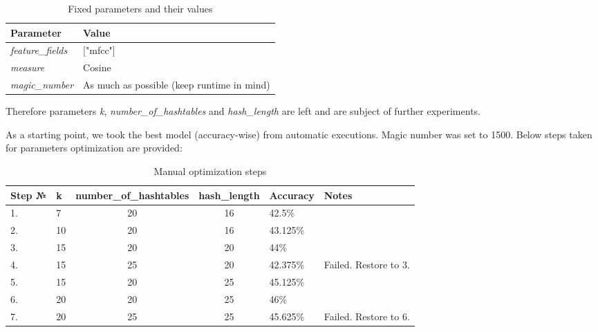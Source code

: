 \documentclass[11pt]{article}
\begin{document}
\begin{table*}[htb]
\begin{center}
\begin{tabular}{|l|l|}
\hline
\textbf{Parameter}              & \textbf{Value}                                                      
\\ \hline
\textit{feature\_fields}        & ["mfcc"]                 
\\ \hline
\textit{measure}                & Cosine 
\\ \hline
\textit{magic\_number}          & As much as possible (keep runtime in mind)
\\ \hline
\end{tabular}
\caption{Fixed parameters and their values}
\end{center}
\end{table*}

Therefore parameters \textit{k}, \textit{number\_of\_hashtables} and \textit{hash\_length} are left and are subject of further experiments.

As a starting point, we took the best model (accuracy-wise) from automatic executions. Magic number was set to 1500. Below steps taken for parameters optimization are provided:

\begin{table*}[htb]
\begin{center}
\begin{tabular}{|l|l|c|c|l|l|}
\hline
\textbf{Step №} & \textbf{k} & \textbf{number\_of\_hashtables} & \textbf{hash\_length} & \textbf{Accuracy} & \textbf{Notes}      
\\ \hline
1.              & 7          & 20                              & 16                    & 42.5\%            &             
\\ \hline
2.              & 10         & 20                              & 16                    & 43.125\%          &            
\\ \hline
3.              & 15         & 20                              & 20                    & 44\%              &       
\\ \hline
4.              & 15         & 25                              & 20                    & 42.375\%          & Failed. Restore to 3.     
\\ \hline
5.              & 15         & 20                              & 25                    & 45.125\%          &       
\\ \hline
6.              & 20         & 20                              & 25                    & 46\%              &       
\\ \hline
7.              & 20         & 25                              & 25                    & 45.625\%          & Failed. Restore to 6.    
\\ \hline

\end{tabular}%
\caption{Manual optimization steps}
\end{center}
\end{table*}
\end{document}
